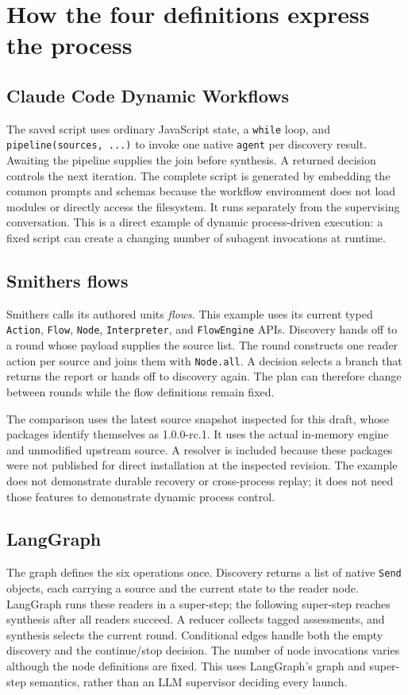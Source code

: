 \documentclass[11pt,letterpaper]{article}
\begin{document}
\section{How the four definitions express the process}
\subsection{Claude Code Dynamic Workflows}
The saved script uses ordinary JavaScript state, a \texttt{while} loop, and \texttt{pipeline(sources, ...)} to invoke one native \texttt{agent} per discovery result. Awaiting the pipeline supplies the join before synthesis. A returned decision controls the next iteration. The complete script is generated by embedding the common prompts and schemas because the workflow environment does not load modules or directly access the filesystem. It runs separately from the supervising conversation. This is a direct example of dynamic process-driven execution: a fixed script can create a changing number of subagent invocations at runtime.\cite{claude-workflows}

\subsection{Smithers flows}
Smithers calls its authored units \emph{flows}. This example uses its current typed \texttt{Action}, \texttt{Flow}, \texttt{Node}, \texttt{Interpreter}, and \texttt{FlowEngine} APIs. Discovery hands off to a round whose payload supplies the source list. The round constructs one reader action per source and joins them with \texttt{Node.all}. A decision selects a branch that returns the report or hands off to discovery again. The plan can therefore change between rounds while the flow definitions remain fixed.\cite{smithers-bodies,smithers-rounds}

The comparison uses the latest source snapshot inspected for this draft, whose packages identify themselves as 1.0.0-rc.1. It uses the actual in-memory engine and unmodified upstream source. A resolver is included because these packages were not published for direct installation at the inspected revision. The example does not demonstrate durable recovery or cross-process replay; it does not need those features to demonstrate dynamic process control.

\subsection{LangGraph}
The graph defines the six operations once. Discovery returns a list of native \texttt{Send} objects, each carrying a source and the current state to the reader node. LangGraph runs these readers in a super-step; the following super-step reaches synthesis after all readers succeed. A reducer collects tagged assessments, and synthesis selects the current round. Conditional edges handle both the empty discovery and the continue/stop decision. The number of node invocations varies although the node definitions are fixed. This uses LangGraph's graph and super-step semantics, rather than an LLM supervisor deciding every launch.\cite{langgraph-api,langgraph-pregel}
\end{document}
